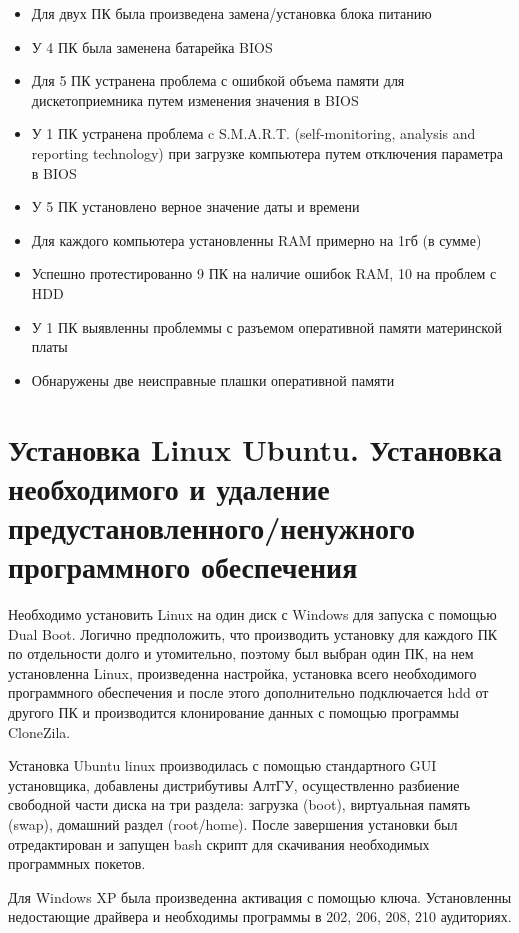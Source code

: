 \documentclass[14pt, oneside]{altsu-report}
\begin{document}
\begin{itemize}
  \item Для двух ПК была произведена замена/установка блока питанию
  \item У 4 ПК была заменена батарейка BIOS
  \item Для 5 ПК устранена проблема с ошибкой объема памяти для дискетоприемника путем изменения значения в BIOS
  \item У 1 ПК устранена проблема c S.M.A.R.T. (self-monitoring, analysis and reporting technology) при загрузке компьютера путем отключения параметра в BIOS
  \item У 5 ПК установлено верное значение даты и времени
  \item Для каждого компьютера установленны RAM примерно на 1гб (в сумме)
  \item Успешно протестированно 9 ПК на наличие ошибок RAM, 10 на проблем с HDD
  \item У 1 ПК выявленны проблеммы с разъемом оперативной памяти материнской платы
  \item Обнаружены две неисправные плашки оперативной памяти
\end{itemize}

\section{Установка Linux Ubuntu. Установка необходимого и удаление предустановленного/ненужного программного обеспечения}
Необходимо установить Linux на один диск с Windows для запуска с помощью Dual Boot. Логично предположить, что производить установку для каждого ПК по отдельности долго и утомительно, поэтому был выбран один ПК, на нем установленна Linux, произведенна настройка, установка всего необходимого программного обеспечения и после этого дополнительно подключается hdd от другого ПК и производится клонирование данных с помощью программы CloneZila. 

Установка Ubuntu linux производилась с помощью стандартного GUI установщика, добавлены дистрибутивы АлтГУ, осуществленно разбиение свободной части диска на три раздела: загрузка (boot), виртуальная память (swap), домашний раздел (root/home). После завершения установки был отредактирован и запущен bash скрипт для скачивания необходимых программных покетов. 

Для Windows XP была произведенна активация с помощью ключа. 
Установленны недостающие драйвера и необходимы программы в 202, 206, 208, 210 аудиториях.
\end{document}
